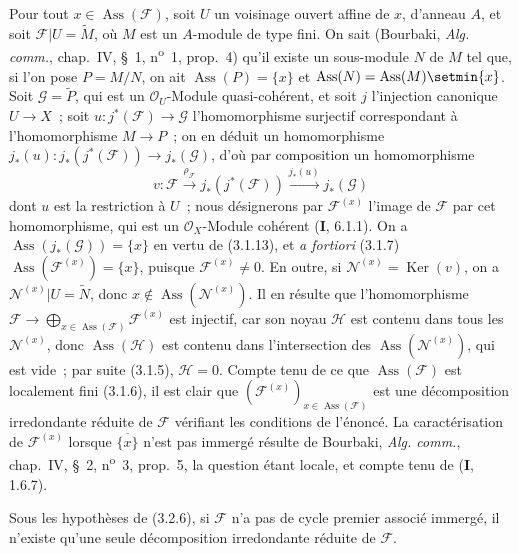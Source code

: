 Pour tout $x\in\operatorname{Ass}(\mathcal F)$, soit $U$ un voisinage ouvert
affine de $x$, d'anneau $A$, et soit $\mathcal F|U=\widetilde M$, où $M$ est
un $A$-module de type fini. On sait (Bourbaki, \emph{Alg. comm.}, chap.~IV,
\S~1, n\textsuperscript{o}~1, prop.~4) qu'il existe un sous-module $N$ de $M$
tel que, si l'on pose $P=M/N$, on ait
$\operatorname{Ass}(P)=\{x\}$ et
$\operatorname{Ass}(N)=\operatorname{Ass}(M)\setmin\{x\}$. Soit
$\mathcal G=\widetilde P$, qui est un $\mathcal O_U$-Module quasi-cohérent, et
soit $j$ l'injection canonique $U\to X$~; soit
$u:j^*(\mathcal F)\to\mathcal G$ l'homomorphisme surjectif correspondant à
l'homomorphisme $M\to P$~; on en déduit un homomorphisme
$j_*(u):j_*(j^*(\mathcal F))\to j_*(\mathcal G)$, d'où par composition un
homomorphisme
\[
v:\mathcal F\xrightarrow{\rho_{\mathcal F}}j_*(j^*(\mathcal F))
\xrightarrow{j_*(u)}j_*(\mathcal G)
\]
dont $u$ est la restriction à $U$~; nous désignerons par
$\mathcal F^{(x)}$ l'image de $\mathcal F$ par cet homomorphisme, qui est un
$\mathcal O_X$-Module cohérent (\textbf{I}, 6.1.1). On a
$\operatorname{Ass}(j_*(\mathcal G))=\{x\}$ en vertu de (3.1.13), et
\emph{a fortiori} (3.1.7)
$\operatorname{Ass}(\mathcal F^{(x)})=\{x\}$, puisque
$\mathcal F^{(x)}\ne0$. En outre, si
$\mathcal N^{(x)}=\operatorname{Ker}(v)$, on a
$\mathcal N^{(x)}|U=\widetilde N$, donc
$x\notin\operatorname{Ass}(\mathcal N^{(x)})$. Il en résulte que
l'homomorphisme
$\mathcal F\to\bigoplus_{x\in\operatorname{Ass}(\mathcal F)}
\mathcal F^{(x)}$ est injectif, car son noyau $\mathcal H$ est contenu dans
tous les $\mathcal N^{(x)}$, donc $\operatorname{Ass}(\mathcal H)$ est contenu
dans l'intersection des $\operatorname{Ass}(\mathcal N^{(x)})$, qui est vide~;
par suite (3.1.5), $\mathcal H=0$. Compte tenu de ce que
$\operatorname{Ass}(\mathcal F)$ est localement fini (3.1.6), il est clair que
$(\mathcal F^{(x)})_{x\in\operatorname{Ass}(\mathcal F)}$ est une
décomposition irredondante réduite de $\mathcal F$ vérifiant les conditions de
l'énoncé. La caractérisation de $\mathcal F^{(x)}$ lorsque
$\overline{\{x\}}$ n'est pas immergé résulte de Bourbaki,
\emph{Alg. comm.}, chap.~IV, \S~2, n\textsuperscript{o}~3, prop.~5, la question
étant locale, et compte tenu de (\textbf{I}, 1.6.7).

\begin{corollary}[3.2.7]
\label{IV.2.3.2.7-fr}
Sous les hypothèses de \textup{(3.2.6)}, si $\mathcal F$ n'a pas de cycle premier
associé immergé, il n'existe qu'une seule décomposition irredondante réduite de
$\mathcal F$.
\end{corollary}

